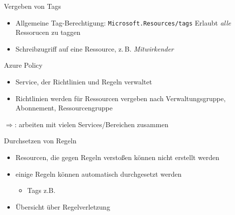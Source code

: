 \begin{flashcard}[Definition]{Vergeben von Tags}
  \begin{itemize}
    \item Allgemeine Tag-Berechtigung: \texttt{Microsoft.Resources/tags}\newline
      Erlaubt \emph{alle} Ressorucen zu taggen 
    \item Schreibzugriff auf eine Ressource, z.\,B. \emph{Mitwirkender}
  \end{itemize}
\end{flashcard}


\begin{flashcard}[Definition]{Azure Policy}
  \begin{itemize}
    \item Service, der Richtlinien und Regeln verwaltet
    \item Richtlinien werden für Ressourcen vergeben nach\newline
      Verwaltungsgruppe, Abonnement, Ressourcengruppe
  \end{itemize}
  $\Rightarrow$: arbeiten mit vielen Services/Bereichen zusammen
\end{flashcard}

\begin{flashcard}[Definition]{Durchsetzen von Regeln}
  \begin{itemize}
    \item Resourcen, die gegen Regeln verstoßen können nicht erstellt werden
    \item einige Regeln können automatisch durchgesetzt werden
    \begin{itemize}
      \item Tags z.B.
    \end{itemize}
    \item Übersicht über Regelverletzung
  \end{itemize}
\end{flashcard}

